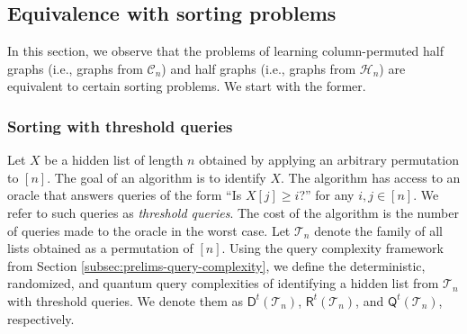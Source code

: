 \documentclass[11pt]{article}
\newcommand{\cC}{\mathcal{C}}
\newcommand{\cH}{\mathcal{H}}
\newcommand{\cT}{\mathcal{T}}
\newcommand{\sD}{\mathsf{D}}
\newcommand{\sQ}{\mathsf{Q}}
\newcommand{\sR}{\mathsf{R}}
\begin{document}
\mainResultColPermutedHalfGraphs*

\mainResultGeneralHalfGraphs*

\noindent


\subsection{Equivalence with sorting problems}\label{subsec:sorting}
In this section, we observe that the problems of learning column-permuted half graphs (i.e., graphs from $\cC_n$) and half graphs (i.e., graphs from $\cH_n$) are equivalent to certain sorting problems. We start with the former.

\subsubsection{Sorting with threshold queries}\label{sec:threshold-sorting}
Let $X$ be a hidden list of length $n$ obtained by applying an arbitrary permutation to $[n]$. The goal of an algorithm is to identify $X$. The algorithm has access to an oracle that answers queries of the form ``Is $X[j] \geq i$?'' for any $i, j \in [n]$. We refer to such queries as \emph{threshold queries}. The cost of the algorithm is the number of queries made to the oracle in the worst case. 
%
Let $\cT_n$ denote the family of all lists obtained as a permutation of $[n]$.
Using the query complexity framework from Section \ref{subsec:prelims-query-complexity},
we define the deterministic, randomized, and quantum query complexities of identifying a hidden list from $\cT_n$ with threshold queries. We denote them as $\sD^t(\cT_n)$, $\sR^t(\cT_n)$, and $\sQ^t(\cT_n)$, respectively.
\end{document}
